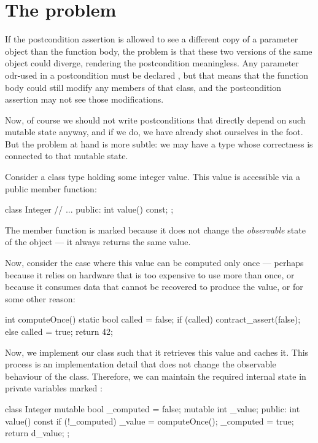 \section{The problem}

If the postcondition assertion is allowed to see a different copy of a parameter object than the function body, the problem is that these two versions of the same object could diverge, rendering the postcondition meaningless. Any parameter odr-used in a postcondition must be declared , but that means that the function body could still modify any  members of that class, and the postcondition assertion may not see those modifications.

Now, of course we should not write postconditions that directly depend on such mutable state anyway, and if we do, we have already shot ourselves in the foot. But the problem at hand is more subtle: we may have a type whose correctness is connected to that mutable state.

Consider a class type holding some integer value. This value is accessible via a public  member function:

\begin{codeblock}
class Integer {
  // ...
public:
  int value() const;
};
\end{codeblock}

The  member function is marked  because it does not change the \emph{observable} state of the object --- it always returns the same value.

Now, consider the case where this value can be computed only once --- perhaps because it relies on hardware that is too expensive to use more than once, or because it consumes data that cannot be recovered to produce the value, or for some other reason:

\begin{codeblock}
int computeOnce()
{
  static bool called = false;
  if (called) {
    contract_assert(false);
  }
  else {
    called = true;
    return 42;
  }
}
\end{codeblock}

Now, we implement our  class such that it retrieves this value and caches it. This process is an implementation detail that does not change the observable behaviour of the class. Therefore, we can maintain the required internal state in private variables marked :
 \begin{codeblock}
class Integer {
  mutable bool _computed = false;
  mutable int  _value;
public:
  int value() const {
    if (!_computed) {
      _value = computeOnce();
      _computed = true;
    }
    return d_value;
  }
};
 \end{codeblock}
 
